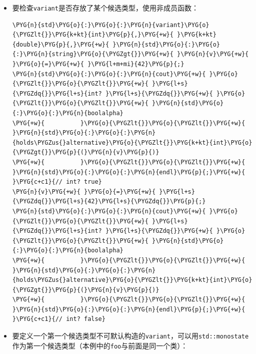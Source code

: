 \begin{itemize}
\item 要检查\texttt{variant}是否存放了某个候选类型，使用非成员函数：



\begin{codeblockbg}
\begin{Verbatim}[commandchars=\\\{\},breaklines=true,breakanywhere=true,fontsize=\codefont,xleftmargin=17bp]
\PYG{n}{std}\PYG{o}{:}\PYG{o}{:}\PYG{n}{variant}\PYG{o}{\PYGZlt{}}\PYG{k+kt}{int}\PYG{p}{,}\PYG{+w}{ }\PYG{k+kt}{double}\PYG{p}{,}\PYG{+w}{ }\PYG{n}{std}\PYG{o}{:}\PYG{o}{:}\PYG{n}{string}\PYG{o}{\PYGZgt{}}\PYG{+w}{ }\PYG{n}{v}\PYG{+w}{ }\PYG{o}{=}\PYG{+w}{ }\PYG{l+m+mi}{42}\PYG{p}{;}
\PYG{n}{std}\PYG{o}{:}\PYG{o}{:}\PYG{n}{cout}\PYG{+w}{ }\PYG{o}{\PYGZlt{}}\PYG{o}{\PYGZlt{}}\PYG{+w}{ }\PYG{l+s}{\PYGZdq{}}\PYG{l+s}{int? }\PYG{l+s}{\PYGZdq{}}\PYG{+w}{ }\PYG{o}{\PYGZlt{}}\PYG{o}{\PYGZlt{}}\PYG{+w}{ }\PYG{n}{std}\PYG{o}{:}\PYG{o}{:}\PYG{n}{boolalpha}
\PYG{+w}{          }\PYG{o}{\PYGZlt{}}\PYG{o}{\PYGZlt{}}\PYG{+w}{ }\PYG{n}{std}\PYG{o}{:}\PYG{o}{:}\PYG{n}{holds\PYGZus{}alternative}\PYG{o}{\PYGZlt{}}\PYG{k+kt}{int}\PYG{o}{\PYGZgt{}}\PYG{p}{(}\PYG{n}{v}\PYG{p}{)}
\PYG{+w}{          }\PYG{o}{\PYGZlt{}}\PYG{o}{\PYGZlt{}}\PYG{+w}{ }\PYG{n}{std}\PYG{o}{:}\PYG{o}{:}\PYG{n}{endl}\PYG{p}{;}\PYG{+w}{ }\PYG{c+c1}{// int? true}
\PYG{n}{v}\PYG{+w}{ }\PYG{o}{=}\PYG{+w}{ }\PYG{l+s}{\PYGZdq{}}\PYG{l+s}{42}\PYG{l+s}{\PYGZdq{}}\PYG{p}{;}
\PYG{n}{std}\PYG{o}{:}\PYG{o}{:}\PYG{n}{cout}\PYG{+w}{ }\PYG{o}{\PYGZlt{}}\PYG{o}{\PYGZlt{}}\PYG{+w}{ }\PYG{l+s}{\PYGZdq{}}\PYG{l+s}{int? }\PYG{l+s}{\PYGZdq{}}\PYG{+w}{ }\PYG{o}{\PYGZlt{}}\PYG{o}{\PYGZlt{}}\PYG{+w}{ }\PYG{n}{std}\PYG{o}{:}\PYG{o}{:}\PYG{n}{boolalpha}
\PYG{+w}{          }\PYG{o}{\PYGZlt{}}\PYG{o}{\PYGZlt{}}\PYG{+w}{ }\PYG{n}{std}\PYG{o}{:}\PYG{o}{:}\PYG{n}{holds\PYGZus{}alternative}\PYG{o}{\PYGZlt{}}\PYG{k+kt}{int}\PYG{o}{\PYGZgt{}}\PYG{p}{(}\PYG{n}{v}\PYG{p}{)}
\PYG{+w}{          }\PYG{o}{\PYGZlt{}}\PYG{o}{\PYGZlt{}}\PYG{+w}{ }\PYG{n}{std}\PYG{o}{:}\PYG{o}{:}\PYG{n}{endl}\PYG{p}{;}\PYG{+w}{ }\PYG{c+c1}{// int? false}
\end{Verbatim}
\end{codeblockbg}



\item 要定义一个第一个候选类型不可默认构造的\texttt{variant}，可以用\texttt{std::\allowbreak{}monostate}作为第一个候选类型（本例中的\texttt{foo}与前面是同一个类）：



\end{itemize}
